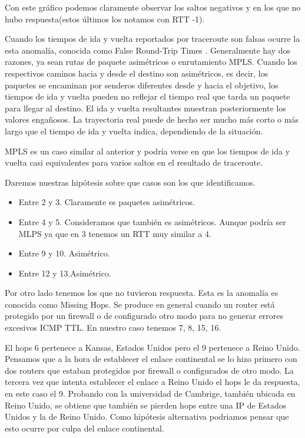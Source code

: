 Con este gráfico podemos claramente observar los saltos negativos y en los que no hubo respuesta(estos
últimos los notamos con RTT -1).

Cuando los tiempos de ida y vuelta reportados por traceroute son falsas ocurre la esta anomalía, conocida
como False Round-Trip Times . Generalmente hay dos razones, ya sean rutas de paquete asimétricos o enrutamiento
MPLS. Cuando los respectivos caminos hacia y desde el destino son asimétricos, es decir, los paquetes se
encaminan por senderos diferentes desde y hacia el objetivo, los tiempos de ida y vuelta pueden no
reflejar el tiempo real que tarda un paquete para llegar al destino. El ida y vuelta resultantes muestran
posteriormente los valores engañosos. La trayectoria real puede de hecho ser mucho más corto o más largo
que el tiempo de ida y vuelta indica, dependiendo de la situación.

MPLS es un caso similar al anterior y podría verse en que los tiempos de ida y vuelta casi equivalentes
para varios saltos en el resultado de traceroute.

Daremos nuestras hipótesis sobre que casos son los que identificamos.

\begin{itemize}
\item Entre 2 y 3. Claramente es paquetes asimétricos.
\item Entre 4 y 5. Consideramos que también es asimétricos. Aunque podría ser MLPS ya que en 3 tenemos un
RTT muy similar a 4.
\item Entre 9 y 10. Asimétrico.
\item Entre 12 y 13.Asimétrico.
\end{itemize}



Por otro lado tenemos los que no tuvieron respuesta. Esta es la anomalía es conocida como Missing Hops.
Se produce en general cuando un router está protegido por un firewall o de configurado otro modo para no
generar errores excesivos ICMP TTL. En nuestro caso tenemos 7, 8, 15, 16.

El hops 6 pertenece a Kansas, Estados Unidos pero el 9 pertenece a Reino Unido. Pensamos que a la hora de
establecer el enlace continental se lo hizo primero con dos routers que estaban protegidos por firewall o
configurados de otro modo. La tercera vez que intenta establecer el enlace a Reino Unido el hops le da
respuesta, en este caso el 9. Probando con la universidad de Cambrige, también ubicada en Reino Unido, se
obtiene que también se pierden hops entre una IP de Estados Unidos y la de Reino Unido. Como hipótesis
alternativa podriamos pensar que esto ocurre por culpa del enlace continental.%

